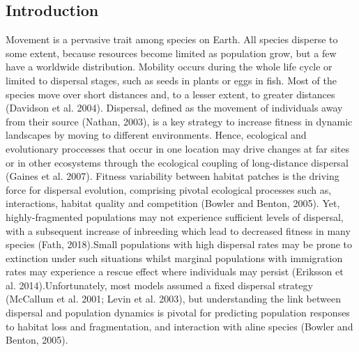 \documentclass[12pt]{article}
\begin{document}
\begin{flushleft}
\section{Introduction}
Movement is a pervasive trait among species on Earth. All species disperse to some extent, because resources become limited as population grow, but a few have a worldwide distribution. Mobility occurs during the whole life cycle or limited to dispersal stages, such as seeds in plants or eggs in fish. Most of the species move over short distances and, to a lesser extent, to greater distances (Davidson et al. 2004). Dispersal, defined as the movement of individuals away from their source (Nathan, 2003), is a key strategy to increase fitness in dynamic landscapes by moving to different environments. Hence, ecological and evolutionary proccesses that occur in one location may drive changes at far sites or in other ecosystems through the ecological coupling of long-distance dispersal (Gaines et al. 2007). Fitness variability between habitat patches is the driving force for dispersal evolution, comprising pivotal ecological processes such as, interactions, habitat quality and competition (Bowler and Benton, 2005). Yet, highly-fragmented populations may not experience sufficient levels of dispersal, with a subsequent increase of inbreeding which lead to decreased fitness in many species (Fath, 2018).Small populations with high dispersal rates may be prone to extinction under such situations  whilst marginal populations with immigration rates may experience a rescue effect where individuals may persist (Eriksson et al. 2014).Unfortunately, most models assumed a fixed dispersal strategy (McCallum et al. 2001; Levin et al. 2003), but understanding the link between dispersal and population dynamics is pivotal for predicting population responses to habitat loss and fragmentation, and interaction with aline species (Bowler and Benton, 2005).


\end{flushleft}
\end{document}
